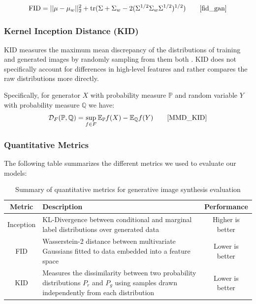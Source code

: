 \documentclass[%
 reprint,
 amsmath,amssymb,
 aps,
]{revtex4-2}
\begin{document}
\begin{equation}
\text{FID}=||\mu -\mu _{w}||_{2}^{2}+\operatorname {tr} (\Sigma +\Sigma _{w}-2(\Sigma ^{1/2}\Sigma _{w}\Sigma ^{1/2})^{1/2})\qquad
\cite{fid_gan}
\end{equation}


\subsubsection{Kernel Inception Distance (KID)}
KID measures the maximum mean discrepancy of the distributions of training and generated images by randomly sampling from them both \cite{MMD_KID}. KID does not specifically account for differences in high-level features and rather compares the raw distributions more directly.


Specifically, for generator $X$ with probability measure $\mathbb{P}$ and random variable $Y$ with probability measure $\mathbb{Q}$ we have:
\begin{equation}
\mathcal{D}_F(\mathbb{P},\mathbb{Q}) = \sup_{f\in F}\mathbb{E}_\mathbb{P}f(X) - \mathbb{E}_\mathbb{Q}f(Y)\qquad
\cite{MMD_KID}
\end{equation}

\subsubsection{Quantitative Metrics}
The following table summarizes the different metrics we used to evaluate our models:
\begin{table}[h]
\caption{\label{tab:metrics}
Summary of quantitative metrics for generative image synthesis evaluation \cite{isscore} \cite{fid_gan} \cite{MMD_KID}} 
\begin{ruledtabular}
    \begin{tabular}{cp{4cm}c}
         Metric& Description &Performance\\ \hline 
 Inception & KL-Divergence between conditional and marginal label distributions over generated data & Higher is better\\ \hline
 FID & Wasserstein-2 distance between multivariate Gaussians fitted to data embedded into a feature space & Lower is better\\ \hline
 KID & Measures the dissimilarity between two probability distributions $P_r$ and $P_g$ using samples drawn independently from each distribution & Lower is better\\
    \end{tabular}
\end{ruledtabular}
\end{table}
\end{document}
